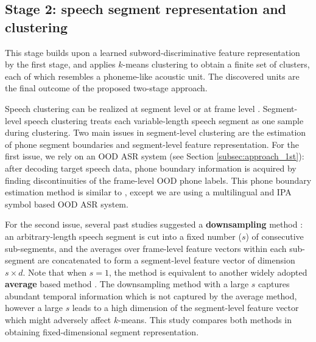 \documentclass[a4paper]{article}
\begin{document}
     

\subsection{Stage 2: speech segment representation and clustering}
\label{subsec:approach_2nd_stage}
This stage builds upon a learned subword-discriminative feature representation by the first stage, and applies $k$-means clustering to   obtain a finite set of clusters, each of which resembles a phoneme-like acoustic unit. The discovered units are the final outcome of the proposed two-stage approach.  

Speech clustering can be realized at segment level \cite{LeeSoongJuang} or at frame level   \cite{chen2015parallel}.  
Segment-level speech clustering   \cite{Bhati2019unsupervised,levin2013fixed} treats each variable-length speech segment as one sample during clustering.
Two main issues in segment-level clustering are the estimation of phone segment boundaries and segment-level feature representation. For the first issue,  we rely on an OOD ASR system (see Section \ref{subsec:approach_1st}):  after decoding  target speech data, phone boundary information is acquired by finding discontinuities of the frame-level OOD phone labels. This phone boundary estimation method is similar to \cite{feng2016exploit}, except we are using a multilingual and  IPA symbol based OOD ASR system.

For the second issue,  several past studies \cite{kamper2017embeded,Bhati2019unsupervised} suggested a \textbf{downsampling}   method \cite{levin2013fixed}: an arbitrary-length speech segment is cut into a fixed number ($s$) of consecutive sub-segments, and 
the averages over frame-level feature vectors within each sub-segment are concatenated 
to form a segment-level feature vector of dimension $s \times d$.
Note that when $s=1$, the method is equivalent to another widely adopted \textbf{average} based method \cite{I3EWang}. The downsampling method with a large $s$ captures abundant temporal information which is not captured by the average method, however a large $s$ leads to a high dimension of the segment-level feature vector which might adversely affect $k$-means. This study compares both methods in obtaining fixed-dimensional segment representation.
\end{document}
